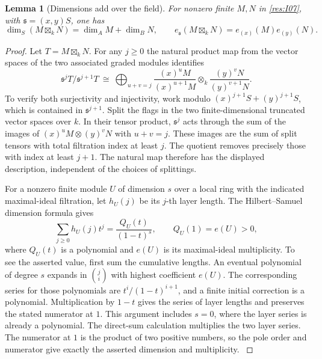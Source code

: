 \documentclass[11pt,oneside,openany]{book}
\newtheorem{lemma}[theorem]{Lemma}
\theoremstyle{definition}
\theoremstyle{remark}
\begin{document}
\begin{lemma}[Dimensions add over the field]\label{res:I08}
For nonzero finite \(M,N\) in \ref{res:I07}, with
\(\mathfrak s=(x,y)S\), one has
\[
 \dim_S(M\boxtimes_k N)=\dim_A M+\dim_B N,\qquad
 e_{\mathfrak s}(M\boxtimes_k N)=e_{(x)}(M)e_{(y)}(N).
\]
\end{lemma}
\begin{proof}
Let \(T=M\boxtimes_k N\). For any \(j\ge 0\) the natural product map
from the vector spaces of the two associated graded modules identifies
\[
 \mathfrak s^jT/\mathfrak s^{j+1}T
   \ \cong\
 \bigoplus_{u+v=j}
       \frac{(x)^uM}{(x)^{u+1}M}
              \otimes_k\frac{(y)^vN}{(y)^{v+1}N}.
\]
To verify both surjectivity and injectivity, work modulo
\((x)^{j+1}S+(y)^{j+1}S\), which is contained in
\(\mathfrak s^{j+1}\). Split the flags in the two finite-dimensional
truncated vector spaces over \(k\). In their tensor product,
\(\mathfrak s^j\) acts through the sum of the images of
\((x)^uM\otimes (y)^vN\) with \(u+v=j\). These images are the sum of
split tensors with total filtration index at least \(j\).
The quotient removes precisely those with index at least \(j+1\).
The natural map therefore has the displayed description, independent
of the choices of splittings.

For a nonzero finite module \(U\) of dimension \(s\) over a local
ring with the indicated maximal-ideal filtration, let \(h_U(j)\)
be its \(j\)-th layer length. The Hilbert--Samuel dimension formula
gives
\[
 \sum_{j\ge 0}h_U(j)t^j=\frac{Q_U(t)}{(1-t)^s},
 \qquad Q_U(1)=e(U)>0 ,
\]
where \(Q_U(t)\) is a polynomial and \(e(U)\) is its maximal-ideal
multiplicity. To see the asserted value, first sum the cumulative
lengths. An eventual polynomial of degree \(s\) expands in
\(\binom{j}{i}\) with highest coefficient \(e(U)\).
The corresponding series for those polynomials are
\(t^i/(1-t)^{i+1}\), and a finite initial correction is a polynomial.
Multiplication by \(1-t\) gives the series of layer lengths and
preserves the stated numerator at \(1\). This argument includes
\(s=0\), where the layer series is already a polynomial.
The direct-sum calculation multiplies the two layer series. The
numerator at \(1\) is the product of two positive numbers, so the
pole order and numerator give exactly the asserted dimension and
multiplicity. \cite[Chapter V, \S B.3]{serre-local}
\end{proof}
\end{document}
